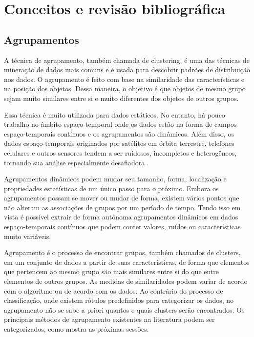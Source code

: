 \chapter{Conceitos e revisão bibliográfica}
\label{cap:estadodaarte}

\section{Agrupamentos}

A técnica de agrupamento, também chamada de clustering, é uma das técnicas de mineração de dados mais comuns e é usada para descobrir padrões de distribuição nos dados. O agrupamento é feito com base na similaridade das características e na posição dos objetos. Dessa maneira, o objetivo é que objetos de mesmo grupo sejam muito similares entre si e muito diferentes dos objetos de outros grupos.

Essa técnica é muito utilizada para dados estáticos. No entanto, há pouco trabalho no âmbito espaço-temporal onde os dados estão na forma de campos espaço-temporais contínuos e os agrupamentos são dinâmicos. Além disso, os dados espaço-temporais originados por satélites em órbita terrestre, telefones celulares e outros sensores tendem a ser ruidosos, incompletos e heterogêneos, tornando sua análise especialmente desafiadora \cite{faghmous2013}.

Agrupamentos dinâmicos podem mudar seu tamanho, forma, localização e propriedades estatísticas de um único passo para o próximo. Embora os agrupamentos possam se mover ou mudar de forma, existem vários pontos que não alteram as associações de grupos por um período de tempo. Tendo isso em vista é possível extrair de forma autônoma agrupamentos dinâmicos em dados espaço-temporais contínuos que podem conter valores, ruídos ou características muito variáveis.

Agrupamento é o processo de encontrar grupos, também chamados de clusters, em
um conjunto de dados a partir de suas características, de forma que elementos que pertencem
ao mesmo grupo são mais similares entre si do que entre elementos de outros grupos. As
medidas de similaridades podem variar de acordo com o algoritmo ou de acordo com os dados.
Ao contrário do processo de classificação, onde existem rótulos predefinidos para categorizar
os dados, no agrupamento não se sabe a priori quantos e quais clusters serão encontrados. Os
principais métodos de agrupamento existentes na literatura podem ser categorizados, como mostra
as próximas sessões.

